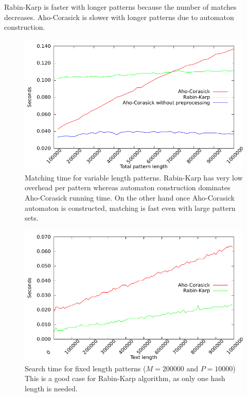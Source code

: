 \documentclass[final]{beamer}
\begin{document}
\begin{poster}
\begin{small}
\centering
Rabin-Karp is faster with longer patterns because the number of matches decreases.
Aho-Corasick is slower with longer patterns due to automaton construction.
\end{small}
\vspace{-7mm}

\begin{figure}
{\centering
 \includegraphics[width=25cm]{var_len.pdf}
\caption[Matching time for variable length patterns]
{
Matching time for variable length patterns.
\newline
\newline
Rabin-Karp has very low overhead per pattern whereas 
automaton construction dominates 
Aho-Corasick running time.
On the other hand once Aho-Corasick automaton is constructed,
matching is fast even with large pattern sets.
}
\label{fig:var_len}
}
\end{figure}

\vspace{-13mm}

\begin{figure}
\centering
 \includegraphics[width=25cm]{text_len_fixed.pdf}
\caption{
Search time for fixed length patterns ($M = 200000$ and $P = 10000$)
    \newline
    \newline
This is a good case for Rabin-Karp algorithm, as only one hash length is needed.
}


\end{figure}
\end{poster}
\end{document}
